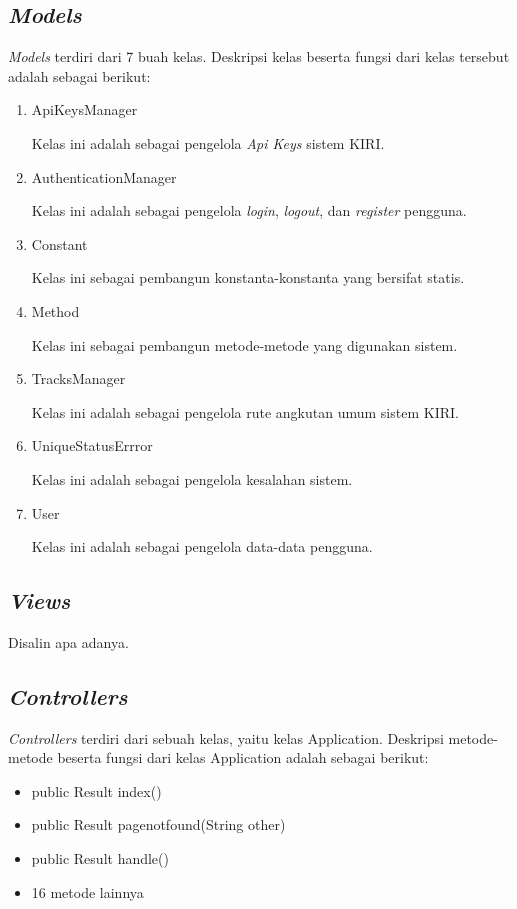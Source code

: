 \subsection{\textit{Models}}
\label{sec:modelsrancangan}
\textit{Models} terdiri dari 7 buah kelas. Deskripsi kelas beserta fungsi dari kelas tersebut adalah sebagai berikut:
\begin{enumerate}
	\item ApiKeysManager

	Kelas ini adalah sebagai pengelola \textit{Api Keys} sistem KIRI.
	\item AuthenticationManager

	Kelas ini adalah sebagai pengelola \textit{login}, \textit{logout}, dan \textit{register} pengguna.
	\item Constant

	Kelas ini sebagai pembangun konstanta-konstanta yang bersifat statis.
	\item Method

	Kelas ini sebagai pembangun metode-metode yang digunakan sistem.
	\item TracksManager

	Kelas ini adalah sebagai pengelola rute angkutan umum sistem KIRI.
	\item UniqueStatusErrror

	Kelas ini adalah sebagai pengelola kesalahan sistem.
	\item User

	Kelas ini adalah sebagai pengelola data-data pengguna.
\end{enumerate}

\subsection{\textit{Views}}
\label{sec:viewssrancangan}
Disalin apa adanya.

\subsection{\textit{Controllers}}
\label{sec:controllerssrancangan}
\textit{Controllers} terdiri dari sebuah kelas, yaitu kelas Application. Deskripsi metode-metode beserta fungsi dari kelas Application adalah sebagai berikut:
\begin{itemize}
	\item public Result index()
	\item public Result pagenotfound(String other)
	\item public Result handle()
	\item 16 metode lainnya
\end{itemize}